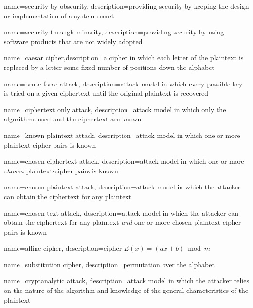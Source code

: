 {
    name={security by obscurity},
    description={providing security by keeping the design or implementation of a system secret}
}

{
    name={security through minority},
    description={providing security by using software products that are not widely adopted}
}

{
    name={caesar cipher},description={a cipher in which each letter of the plaintext is replaced by a letter some fixed number of positions down the alphabet}
}

{
    name={brute-force attack},
    description={attack model in which every possible key is tried on a given ciphertext until the original plaintext is recovered}
}

{
    name={ciphertext only attack},
    description={attack model in which only the algorithms used and the ciphertext are known}
}

{
    name={known plaintext attack},
    description={attack model in which one or more plaintext-cipher pairs is known}
}

{
    name={chosen ciphertext attack},
    description={attack model in which one or more \emph{chosen} plaintext-cipher pairs is known}
}

{
    name={chosen plaintext attack},
    description={attack model in which the attacker can obtain the ciphertext for any plaintext}
}

{
    name={chosen text attack},
    description={attack model in which the attacker can obtain the ciphertext for any plaintext \emph{and} one or more chosen plaintext-cipher pairs is known}
}

{
    name={affine cipher},
    description={cipher $E(x) = (ax + b)\bmod{m}$}
}

{
    name={substitution cipher},
    description={permutation over the alphabet}
}

{
    name={cryptanalytic attack},
    description={attack model in which the attacker relies on the nature of the algorithm and knowledge of the general characteristics of the plaintext}
}

